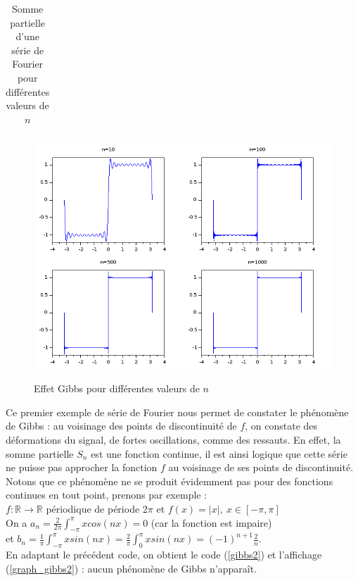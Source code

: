 \documentclass[a4paper,10pt]{report}
\begin{document}
\begin{table}[H]
\caption{Somme partielle d'une série de Fourier pour différentes valeurs de $n$}
\begin{tabular}{l}

\label{gibbs}
\end{tabular}
\end{table}

\begin{figure}[H]
\centering
\caption{Effet Gibbs pour différentes valeurs de $n$}
\includegraphics[width=\textwidth]{gibbs.png}
\label{graph_gibbs}
\end{figure}

Ce premier exemple de série de Fourier nous permet de constater le phénomène de Gibbs : au voisinage des points de discontinuité de $f$, on constate des déformations du signal, de fortes oscillations, comme des ressauts. En effet, la somme partielle $S_n$ est une fonction continue, il est ainsi logique que cette série ne puisse pas approcher la fonction $f$ au voisinage de ses points de discontinuité.\\

Notons que ce phénomène ne se produit évidemment pas pour des fonctions continues en tout point, prenons par exemple :\\
$f:\mathbb{R}\longrightarrow \mathbb{R}$ périodique de période $2\pi$ et $f(x)=|x|,\ x \in [-\pi,\pi]$\\
On a $a_n=\frac{2}{2\pi} \int_{-\pi}^{\pi}xcos(nx)=0$ (car la fonction est impaire)\\
et $b_n=\frac{1}{\pi} \int_{-\pi}^{\pi}xsin(nx)=\frac{2}{\pi} \int_{0}^{\pi}xsin(nx)=(-1)^{n+1}\frac{2}{n}$.\\
En adaptant le précédent code, on obtient le code (\ref{gibbs2}) et l'affichage (\ref{graph_gibbs2}) : aucun phénomène de Gibbs n'apparaît.
\end{document}
